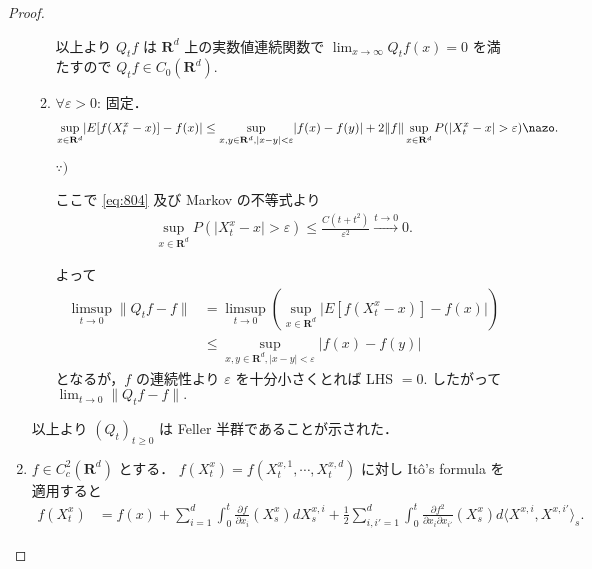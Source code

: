 \documentclass{jsarticle}
\begin{document}
\begin{proof}
\begin{enumerate}[label=(\arabic*)]
\begin{enumerate}[label=(\roman*)]
            以上より $Q_{t}f$ は $\mathbf{R}^d$ 上の実数値連続関数で $\lim_{x\to\infty}Q_{t}f(x)=0$ を満たすので $Q_{t}f\in C_{0}(\mathbf{R}^d).$
                
            \item
            $\forall \varepsilon>0$: 固定．
            \begin{align}
                \sup_{x\in\mathbf{R}^d}\lvert E[f(X_{t}^{x}-x)]-f(x)\rvert
                \le \sup_{x, y\in\mathbf{R}^d, \lvert x-y\rvert<\varepsilon}\lvert f(x)-f(y)\rvert
                + 2\lVert f\rVert\sup_{x\in\mathbf{R}^d}P(\lvert X_{t}^{x}-x\rvert>\varepsilon)\nazo.
            \end{align}
            
            \begin{screen}
                $\because)$
            \end{screen}

            ここで \eqref{eq:804} 及び Markov の不等式より
            \begin{align}
                \sup_{x\in\mathbf{R}^d}P(\lvert X_{t}^{x}-x\rvert>\varepsilon)
                \le \frac{C(t+t^2)}{\varepsilon^2}\xrightarrow{t\to0}0.
            \end{align}

            よって
            \begin{align}
                \limsup_{t\to0}\lVert Q_{t}f-f\rVert
                &= \limsup_{t\to0}(\sup_{x\in\mathbf{R}^d}\lvert E[f(X_{t}^{x}-x)]-f(x)\rvert) \\
                &\le \sup_{x, y\in\mathbf{R}^d, \lvert x-y\rvert<\varepsilon}\lvert f(x)-f(y)\rvert
            \end{align}
            となるが，$f$ の連続性より $\varepsilon$ を十分小さくとれば LHS $=0.$
            したがって $\lim_{t\to0}\lVert Q_{t}f-f\rVert.$
        \end{enumerate}

        以上より $(Q_{t})_{t\ge0}$ は Feller 半群であることが示された．
        
        \item
        $f\in C_{c}^2(\mathbf{R}^d)$ とする．
        $f(X_{t}^{x})=f(X_{t}^{x, 1},\dotsb, X_{t}^{x, d})$ に対し It\^{o}'s formula を適用すると
        \begin{align}
            f(X_{t}^{x})
            &= f(x)
            + \sum_{i=1}^{d}\int_{0}^{t}\frac{\partial f}{\partial x_{i}}(X_{s}^{x})dX_{s}^{x, i}
            + \frac{1}{2}\sum_{i, i'=1}^{d}\int_{0}^{t}\frac{\partial f^2}{\partial x_{i}\partial x_{i'}}(X_{s}^{x})d\langle X^{x, i}, X^{x, i'}\rangle_{s}.
        \end{align}


\end{enumerate}
\end{proof}
\end{document}

